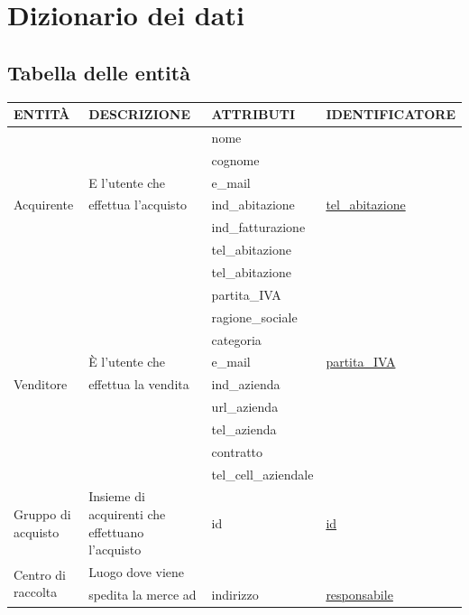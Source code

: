 \documentclass[a4paper, 10pt]{report}
\begin{document}
\chapter{Dizionario dei dati}
\section{Tabella delle entit\`a}
\begin{longtable}[!h]{|l|p{3cm}|p{3cm}|p{4cm}|}

\hline
\textbf{ENTIT\`A}&\textbf{DESCRIZIONE}&\textbf{ATTRIBUTI}&\textbf{IDENTIFICATORE}\\
\hline
 \multirow{7}{*}{Acquirente} & & nome & \\
                             & & cognome & \\
                             & E l'utente che & e\_mail & \\
                             & effettua l'acquisto & ind\_abitazione & \underline{tel\_abitazione}\\
                             & & ind\_fatturazione & \\
                             & & tel\_abitazione & \\
                             & & tel\_abitazione & \\
\hline                                                                      
\multirow{9}{*}{Venditore} 
                           & &partita\_IVA &\\
                           & &ragione\_sociale &\\ 
                           & &categoria &\\
                           &\`E l'utente che & e\_mail & \underline{partita\_IVA}\\
                           &effettua la vendita &ind\_azienda &\\
                           & &url\_azienda &\\
                           & &tel\_azienda &\\
                           & &contratto &\\
                           & &tel\_cell\_aziendale &\\
\hline
Gruppo di acquisto & Insieme di acquirenti che effettuano l'acquisto & id & \underline{id}\\
\hline
\multirow{4}{*}{Centro di raccolta} & Luogo dove viene & &\\
                                    & spedita la merce ad  & indirizzo &\underline{responsabile}\\

\end{longtable}
\end{document}
